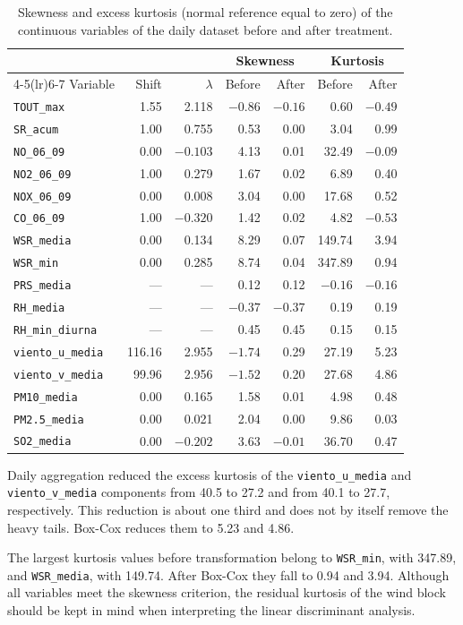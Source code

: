 \begin{table}[pos=t]
  \centering
  \caption{Skewness and excess kurtosis (normal reference equal to zero) of
    the continuous variables of the daily dataset before and after
    treatment.}
  \label{tab:dic-diario-sesgo}
  \small
  \setlength{\tabcolsep}{6pt}
  \begin{tabular}{lrrrrrr}
    \toprule
    & & & \multicolumn{2}{c}{Skewness} & \multicolumn{2}{c}{Kurtosis} \\
    \cmidrule(lr){4-5}\cmidrule(lr){6-7}
    Variable & Shift & $\lambda$ & Before & After & Before & After \\
    \midrule
    \texttt{TOUT\_max} & 1.55 & 2.118 & $-0.86$ & $-0.16$ & 0.60 & $-0.49$ \\
    \texttt{SR\_acum} & 1.00 & 0.755 & 0.53 & 0.00 & 3.04 & 0.99 \\
    \texttt{NO\_06\_09} & 0.00 & $-0.103$ & 4.13 & 0.01 & 32.49 & $-0.09$ \\
    \texttt{NO2\_06\_09} & 1.00 & 0.279 & 1.67 & 0.02 & 6.89 & 0.40 \\
    \texttt{NOX\_06\_09} & 0.00 & 0.008 & 3.04 & 0.00 & 17.68 & 0.52 \\
    \texttt{CO\_06\_09} & 1.00 & $-0.320$ & 1.42 & 0.02 & 4.82 & $-0.53$ \\
    \texttt{WSR\_media} & 0.00 & 0.134 & 8.29 & 0.07 & 149.74 & 3.94 \\
    \texttt{WSR\_min} & 0.00 & 0.285 & 8.74 & 0.04 & 347.89 & 0.94 \\
    \texttt{PRS\_media} & --- & --- & 0.12 & 0.12 & $-0.16$ & $-0.16$ \\
    \texttt{RH\_media} & --- & --- & $-0.37$ & $-0.37$ & 0.19 & 0.19 \\
    \texttt{RH\_min\_diurna} & --- & --- & 0.45 & 0.45 & 0.15 & 0.15 \\
    \texttt{viento\_u\_media} & 116.16 & 2.955 & $-1.74$ & 0.29 & 27.19 & 5.23 \\
    \texttt{viento\_v\_media} & 99.96 & 2.956 & $-1.52$ & 0.20 & 27.68 & 4.86 \\
    \texttt{PM10\_media} & 0.00 & 0.165 & 1.58 & 0.01 & 4.98 & 0.48 \\
    \texttt{PM2.5\_media} & 0.00 & 0.021 & 2.04 & 0.00 & 9.86 & 0.03 \\
    \texttt{SO2\_media} & 0.00 & $-0.202$ & 3.63 & $-0.01$ & 36.70 & 0.47 \\
    \bottomrule
  \end{tabular}
\end{table}

Daily aggregation reduced the excess kurtosis of the
\texttt{viento\_u\_media} and \texttt{viento\_v\_media} components from 40.5
to 27.2 and from 40.1 to 27.7, respectively. This reduction is about one
third and does not by itself remove the heavy tails. Box-Cox reduces them to
5.23 and 4.86.

The largest kurtosis values before transformation belong to
\texttt{WSR\_min}, with 347.89, and \texttt{WSR\_media}, with 149.74. After
Box-Cox they fall to 0.94 and 3.94. Although all variables meet the skewness
criterion, the residual kurtosis of the wind block should be kept in mind
when interpreting the linear discriminant analysis.
